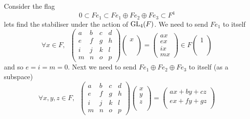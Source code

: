 \begin{example}[\(\GL_n\)]
    \begin{example}
        Consider the flag
        \[0 \subset Fe_1 \subset Fe_1\oplus Fe_2 \oplus Fe_3 \subset F^4\]
        lets find the stabiliser under the action of \(\operatorname{GL}_4(F)\). We need to send \(Fe_1\) to itself
        \[\forall x\in F, \;\; \begin{pmatrix}
            a & b&c &d\\
            e&f&g &h \\
            i&j&k&l \\
            m&n&o&p
        \end{pmatrix}\begin{pmatrix}
            x \\
            \\
            \\
            \\
        \end{pmatrix} = \begin{pmatrix}
            ax\\
            ex\\
            ix\\
            mx 
        \end{pmatrix} \in F\begin{pmatrix}
            1 \\
            \\
            \\
            \\
        \end{pmatrix} \]
        and so \(e = i = m = 0\). Next we need to send \(Fe_1\oplus Fe_2 \oplus Fe_3\) to itself (as a subspace)
        \[\forall x,y,z\in F, \;\;\begin{pmatrix}
            a & b&c &d\\
            e&f&g &h \\
            i&j&k&l \\
            m&n&o&p
        \end{pmatrix}\begin{pmatrix}
            x \\
            y\\
            z\\
            \\
        \end{pmatrix} = \begin{pmatrix}
            ax+by+cz\\
            ex+fy+gz\\

\end{pmatrix}\]
\end{example}
\end{example}
